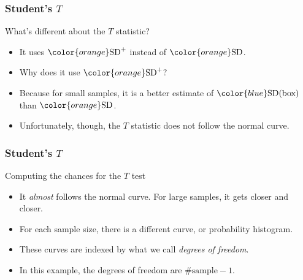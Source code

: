 \documentclass[handout]{beamer}
\begin{document}

   \begin{frame} \frametitle{Student's $T$}

   \begin{block}
   {What's different about the $T$ statistic?}
   \begin{itemize}

     \item It uses ${\color{orange} \text{SD}^+}$ instead
     of ${\color{orange} \text{SD}}$.
     \item Why does it use ${\color{orange} \text{SD}^+}$?
       \item     Because for small samples,
     it is a better estimate of ${\color{blue} \text{SD(box)}}$
     than ${\color{orange} \text{SD}}$.

   \item Unfortunately, though, the $T$ statistic does not follow the
   normal curve.
   \end{itemize}
   \end{block}
   \end{frame}


   \begin{frame} \frametitle{Student's $T$}

   \begin{block}
   {Computing the chances for the $T$ test}
   \begin{itemize}

   \item It {\em almost} follows the normal curve. For large
     samples, it gets closer and closer.

   \item For each sample size, there is a different curve, or
   probability histogram.

   \item These curves are indexed by what we call {\em degrees of freedom}.

   \item In this example, the degrees of freedom are $\# \text{sample}-1$.
   \end{itemize}
   \end{block}
   \end{frame}

\end{document}
